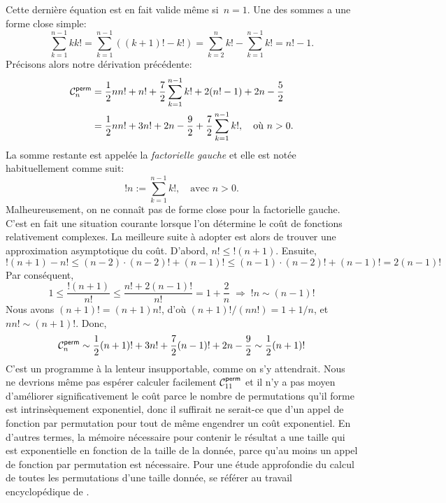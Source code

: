 Cette dernière équation est en fait valide même si~\(n = 1\). Une des
sommes a une forme close simple:
\begin{equation*}
\sum_{k=1}^{n-1}{kk!} = \sum_{k=1}^{n-1}((k+1)! - k!) =
\sum_{k=2}^{n}{k!} - \sum_{k=1}^{n-1}{k!} = n! - 1.
\end{equation*}
Précisons alors notre dérivation précédente:
\begin{align*}
\C{\fun{perm}}{n}
  &= \frac{1}{2}{nn!} + n! + \frac{7}{2}\sum_{k=1}^{n-1}{k!}
     + 2(n! - 1) + 2n - \frac{5}{2}\\
  &= \frac{1}{2}{nn!} + 3n! 
     + 2n - \frac{9}{2} + \frac{7}{2}\sum_{k=1}^{n-1}{k!},\quad
     \text{où \(n > 0\)}.
\end{align*}
La somme restante est appelée la \emph{factorielle gauche}
\citep{Kurepa_1971} et elle est notée
habituellement comme suit:
\begin{equation*}
!n := \sum_{k=1}^{n-1}{k!},\quad \text{avec \(n > 0\)}.
\end{equation*}
Malheureusement, on ne connaît pas de forme close pour la factorielle
gauche.  C'est en fait une situation courante lorsque l'on détermine
le coût de fonctions relativement complexes. La meilleure suite à
adopter est alors de trouver une approximation asymptotique du
coût. D'abord, \(n!  \leqslant !(n+1)\). Ensuite,
\begin{equation*}
!(n+1) - n! \leqslant (n-2) \cdot (n-2)! + (n-1)! \leqslant
(n-1) \cdot (n-2)! + (n-1)! = 2 (n-1)!
\end{equation*}
Par conséquent,
\begin{equation*}
1 \leqslant \frac{!(n+1)}{n!} \leqslant \frac{n! + 2(n-1)!}{n!} = 1 +
\frac{2}{n} \;\Rightarrow\; !n \sim (n-1)!
\end{equation*}
Nous avons \((n+1)! = (n+1)n!\), d'où \((n+1)!/(nn!) = 1 + 1/n\), et
\(nn!  \sim (n+1)!\). Donc,
\begin{equation*}
\abovedisplayshortskip=0pt
\abovedisplayskip=0pt
\C{\fun{perm}}{n} \sim \frac{1}{2}(n+1)! + 3n! + \frac{7}{2}(n-1)!
+ 2n - \frac{9}{2} \sim \frac{1}{2}(n+1)!
\end{equation*}
C'est un programme à la lenteur insupportable, comme on s'y
attendrait. Nous ne devrions même pas espérer calculer facilement
\(\C{\fun{perm}}{11}\)  et il n'y a
pas moyen d'améliorer significativement le coût parce le nombre de
permutations qu'il forme est intrinsèquement exponentiel, donc il
suffirait ne serait-ce que d'un appel de fonction par permutation pour
tout de même engendrer un coût exponentiel. En d'autres termes, la
mémoire nécessaire pour contenir le résultat a une taille qui est
exponentielle en fonction de la taille de la donnée, parce qu'au moins
un appel de fonction par permutation est nécessaire. Pour une étude
approfondie du calcul de toutes les permutations d'une taille donnée,
se référer au travail encyclopédique de \cite{Knuth_2011}.

